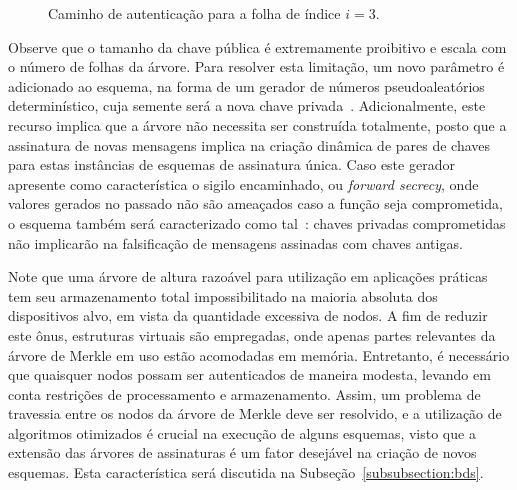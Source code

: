 \documentclass{ufsctex/ufsctex}
\newcommand{\pk}{\mathcal{P}_{k}}
\begin{document}
\begin{figure}
  \centering
  \caption{Caminho de autenticação para a folha de índice $i = 3$.}\label{fig:9}
\end{figure}

Observe que o tamanho da chave pública é extremamente proibitivo e escala com o
número de folhas da árvore. Para resolver esta limitação, um novo parâmetro é
adicionado ao esquema, na forma de um gerador de números pseudoaleatórios
determinístico, cuja semente será a nova chave privada~\cite[Subseção
6.4.2.3]{Goldreich:book:2004}. Adicionalmente, este recurso implica que a
árvore não necessita ser construída totalmente, posto que a assinatura de novas
mensagens implica na criação dinâmica de pares de chaves para estas instâncias
de esquemas de assinatura única. Caso este gerador apresente como
característica o sigilo encaminhado, ou \emph{forward secrecy}, onde valores
gerados no passado não são ameaçados caso a função seja comprometida, o esquema
também será caracterizado como tal~\cite[pp.  45]{Bernstein:book:2008}: chaves
privadas comprometidas não implicarão na falsificação de mensagens assinadas
com chaves antigas.

Note que uma árvore de altura razoável para utilização em aplicações práticas
tem seu armazenamento total impossibilitado na maioria absoluta dos
dispositivos alvo, em vista da quantidade excessiva de nodos. A fim de reduzir
este ônus, estruturas virtuais são empregadas, onde apenas partes relevantes da
árvore de Merkle em uso estão acomodadas em memória. Entretanto, é necessário
que quaisquer nodos possam ser autenticados de maneira modesta, levando em
conta restrições de processamento e armazenamento. Assim, um problema de
travessia entre os nodos da árvore de Merkle deve ser resolvido, e a utilização
de algoritmos otimizados é crucial na execução de alguns esquemas, visto que a
extensão das árvores de assinaturas é um fator desejável na criação de novos
esquemas. Esta característica será discutida na
Subseção~\ref{subsubsection:bds}.
\end{document}
